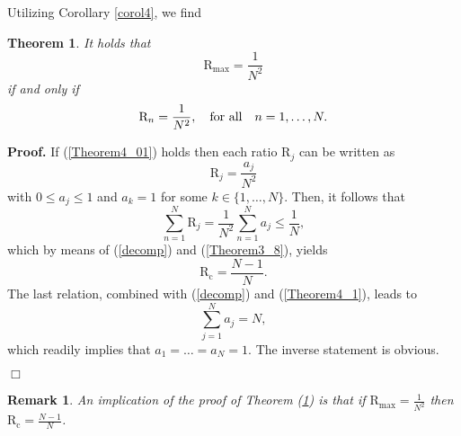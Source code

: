 \documentclass{article}
\newtheorem{theorem}{Theorem}
\newtheorem{remark}{Remark}
\begin{document}
Utilizing Corollary \ref{corol4}, we find
%
\begin{theorem}\label{Theorem4}
    It holds that
    \begin{equation}
    \label{Theorem4_01}
        \mathrm{R}_{\mathrm{max}}=\frac{1}{N^2}\end{equation}
        if and only if
        \begin{equation} \label{Theorem4_02}   
        \mathrm{R}_{n}=\frac{1}{N^2},\quad \mbox{\rm{for all}} \quad n=1,\ldots,N.
    \end{equation}
%
\end{theorem}
%
\textbf{Proof.}
%
If (\ref{Theorem4_01}) holds then each ratio $\mathrm{R}_j$ can be written as 
%
$$\mathrm{R}_{j}=\frac{a_j}{N^2}$$
%
with $0\leq a_j\leq1$ and $a_k=1$ for some $k\in\{1,\ldots,N\}$. Then, it follows that
%
\begin{equation}
\label{Theorem4_1}
\sum_{n=1}^{N}\mathrm{R}_j=\frac{1}{N^2}\sum_{n=1}^{N}a_j\leq\frac{1}{N},
\end{equation} 
%
which by means of (\ref{decomp}) and (\ref{Theorem3_8}), yields
%
$$\mathrm{R}_{\mathrm{c}}=\frac{N-1}{N}.$$
%
The last relation, combined with (\ref{decomp}) and (\ref{Theorem4_1}), leads to 
%
$$\sum_{j=1}^{N}a_j=N,$$ 
%
which readily implies that $a_1=\ldots=a_N=1$.
The inverse statement is obvious.
 \begin{flushright}$\Box$\end{flushright}
%
\begin{remark}
    An implication of the proof of Theorem (\ref{Theorem4}) is that if $\mathrm{R}_{\mathrm{max}}=\frac{1}{N^2}$ then $\mathrm{R}_{\mathrm{c}}=\frac{N-1}{N}$.
\end{remark} 
%
\end{document}
